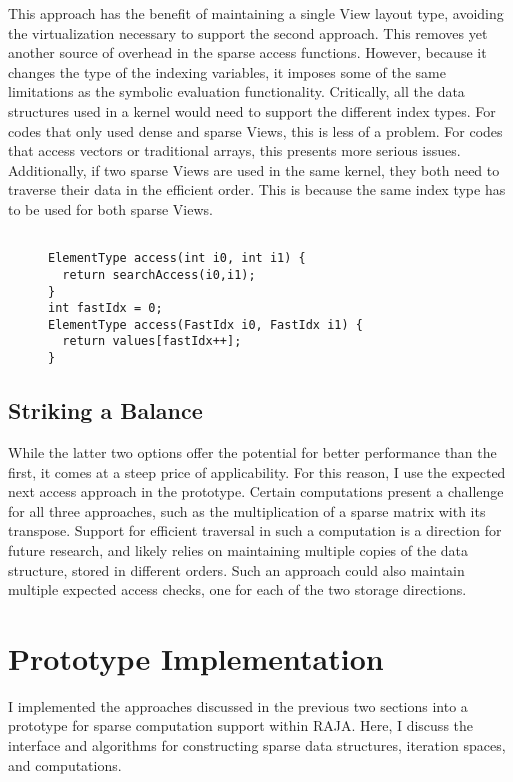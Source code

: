 This approach has the benefit of maintaining a single View layout type, avoiding the virtualization necessary to support the second approach.
This removes yet another source of overhead in the sparse access functions.
However, because it changes the type of the indexing variables, it imposes some of the same limitations as the symbolic evaluation functionality. 
Critically, all the data structures used in a kernel would need to support the different index types. 
For codes that only used dense and sparse Views, this is less of a problem.
For codes that access vectors or traditional arrays, this presents more serious issues.
Additionally, if two sparse Views are used in the same kernel, they both need to traverse their data in the efficient order.
This is because the same index type has to be used for both sparse Views.


\begin{figure}
\begin{lstlisting}[caption={Reference implementation for the Specialized Index Types approach.}, label=specializedIndexImpl]

ElementType access(int i0, int i1) {
  return searchAccess(i0,i1);
}
int fastIdx = 0;
ElementType access(FastIdx i0, FastIdx i1) {
  return values[fastIdx++];
}
\end{lstlisting}
\end{figure}

\subsection{Striking a Balance}
While the latter two options offer the potential for better performance than the first, it comes at a steep price of applicability.
For this reason, I use the expected next access approach in the prototype.
Certain computations present a challenge for all three approaches, such as the multiplication of a sparse matrix with its transpose.
Support for efficient traversal in such a computation is a direction for future research, and likely relies on maintaining multiple copies of the data structure, stored in different orders.
Such an approach could also maintain multiple expected access checks, one for each of the two storage directions.

\section{Prototype Implementation}
I implemented the approaches discussed in the previous two sections into a prototype for sparse computation support within RAJA\@.
Here, I discuss the interface and algorithms for constructing sparse data structures, iteration spaces, and computations.

